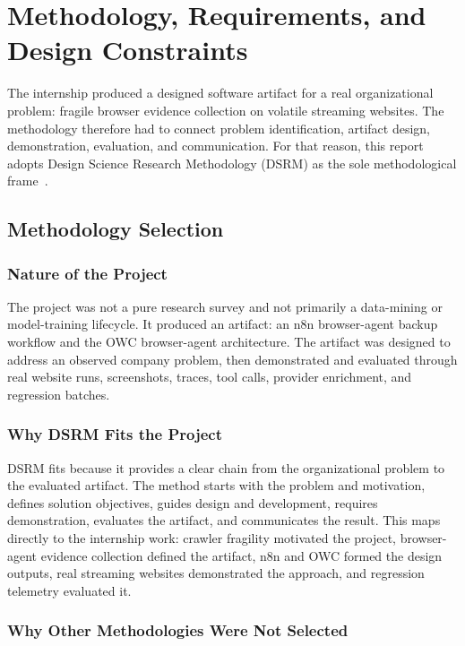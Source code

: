 \chapter{Methodology, Requirements, and Design Constraints}

The internship produced a designed software artifact for a real organizational
problem: fragile browser evidence collection on volatile streaming websites.
The methodology therefore had to connect problem identification, artifact
design, demonstration, evaluation, and communication. For that reason, this
report adopts Design Science Research Methodology (DSRM) as the sole
methodological frame~\cite{peffers-dsrm,hevner-dsr}.

\section{Methodology Selection}

\subsection{Nature of the Project}

The project was not a pure research survey and not primarily a data-mining or
model-training lifecycle. It produced an artifact: an n8n browser-agent backup
workflow and the OWC browser-agent architecture. The artifact was designed to
address an observed company problem, then demonstrated and evaluated through
real website runs, screenshots, traces, tool calls, provider enrichment, and
regression batches.

\subsection{Why DSRM Fits the Project}

DSRM fits because it provides a clear chain from the organizational problem to
the evaluated artifact. The method starts with the problem and motivation,
defines solution objectives, guides design and development, requires
demonstration, evaluates the artifact, and communicates the result. This maps
directly to the internship work: crawler fragility motivated the project,
browser-agent evidence collection defined the artifact, n8n and OWC formed the
design outputs, real streaming websites demonstrated the approach, and
regression telemetry evaluated it.

\subsection{Why Other Methodologies Were Not Selected}

